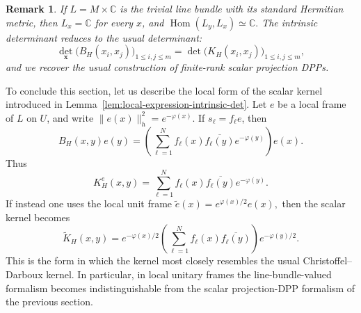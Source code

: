 \documentclass[12pt,a4paper,reqno]{article}
\theoremstyle{thmstyleone}
\theoremstyle{thmstylethree}
\theoremstyle{thmstyletwo}
\newtheorem{remark}[theorem]{Remark}
\numberwithin{equation}{subsection}
\def\leq{\leqslant}
\begin{document}
\begin{remark}
If $L=M\times\mathbb C$ is the trivial line bundle with its standard Hermitian metric, then $L_x=\mathbb C$ for every $x$, and $\operatorname{Hom}(L_y,L_x)\simeq \mathbb C.$ The intrinsic determinant reduces to the usual determinant:
\[
    \det_{\mathbf x}
    \big(B_H(x_i,x_j)\big)_{1\leq i,j\leq m}
    =
    \det\big(K_H(x_i,x_j)\big)_{1\leq i,j\leq m},
\]
and we recover the usual construction of finite-rank scalar projection DPPs.
\end{remark}

To conclude this section, let us describe the local form of the scalar kernel introduced in Lemma~\ref{lem:local-expression-intrinsic-det}. Let $e$ be a local frame of $L$ on $U$, and write $\|e(x)\|_h^2=e^{-\varphi(x)}.$ If $s_\ell=f_\ell e$, then
\[
    B_H(x,y)e(y)
    =
    \left(
        \sum_{\ell=1}^N
        f_\ell(x)\overline{f_\ell(y)}e^{-\varphi(y)}
    \right)e(x).
\]
Thus
\[
    K_H^e(x,y)
    =
    \sum_{\ell=1}^N
    f_\ell(x)\overline{f_\ell(y)}e^{-\varphi(y)}.
\]
If instead one uses the local unit frame $\widetilde e(x)=e^{\varphi(x)/2}e(x),$ then the scalar kernel becomes
\[
    \widetilde K_H(x,y)
    =
    e^{-\varphi(x)/2}
    \left(
        \sum_{\ell=1}^N f_\ell(x)\overline{f_\ell(y)}
    \right)
    e^{-\varphi(y)/2}.
\]
This is the form in which the kernel most closely resembles the usual Christoffel--Darboux kernel. In particular, in local unitary frames the line-bundle-valued formalism becomes indistinguishable from the scalar projection-DPP formalism of the previous section.


\end{document}
